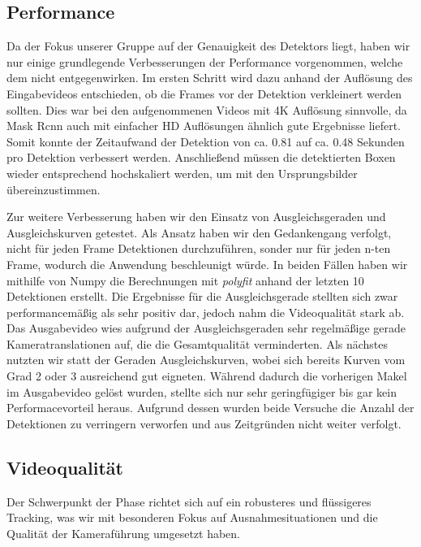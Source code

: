 \subsection*{Performance}
Da der Fokus unserer Gruppe auf der Genauigkeit des Detektors liegt, haben wir nur einige grundlegende Verbesserungen der Performance vorgenommen, welche dem nicht entgegenwirken. 
Im ersten Schritt wird dazu anhand der Auflösung des Eingabevideos entschieden, ob die Frames vor der Detektion verkleinert werden sollten. Dies war bei den aufgenommenen Videos mit 4K Auflösung sinnvolle, da Mask Rcnn auch mit einfacher HD Auflösungen ähnlich gute Ergebnisse liefert. Somit konnte der Zeitaufwand der Detektion von ca. 0.81  auf ca. 0.48 Sekunden pro Detektion verbessert werden. Anschließend müssen die detektierten Boxen wieder entsprechend hochskaliert werden, um mit den Ursprungsbilder übereinzustimmen.

Zur weitere Verbesserung haben wir den Einsatz von Ausgleichsgeraden und Ausgleichskurven getestet. Als Ansatz haben wir den Gedankengang verfolgt, nicht für jeden Frame Detektionen durchzuführen, sonder nur für jeden \linebreak n-ten Frame, wodurch die Anwendung beschleunigt würde. 
In beiden Fällen haben wir mithilfe von Numpy die Berechnungen mit \emph{polyfit} anhand der letzten 10 Detektionen erstellt. Die Ergebnisse für die Ausgleichsgerade stellten sich zwar performancemäßig als sehr positiv dar, jedoch nahm die Videoqualität stark ab. Das Ausgabevideo wies aufgrund der Ausgleichsgeraden sehr regelmäßige gerade Kameratranslationen auf, die die Gesamtqualität verminderten.
Als nächstes nutzten wir statt der Geraden Ausgleichskurven, wobei sich bereits Kurven vom Grad 2 oder 3 ausreichend gut eigneten. Während dadurch die vorherigen Makel im Ausgabevideo gelöst wurden, stellte sich nur sehr geringfügiger bis gar kein Performacevorteil heraus. Aufgrund dessen wurden beide Versuche die Anzahl der Detektionen zu verringern verworfen und aus Zeitgründen nicht weiter verfolgt.




\subsection*{Videoqualität}
Der Schwerpunkt der Phase richtet sich auf ein robusteres und flüssigeres Tracking, was wir mit besonderen Fokus auf Ausnahmesituationen und die Qualität der Kameraführung umgesetzt haben.




